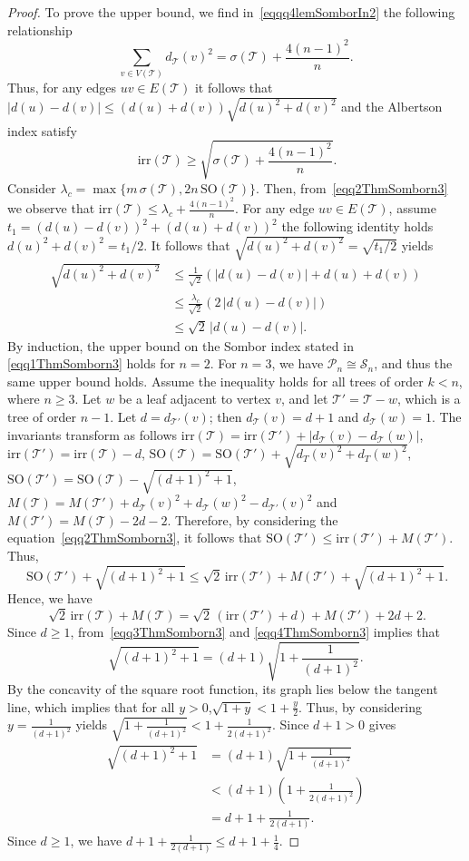 \documentclass[12pt, a4paper]{article}
\newcommand{\TT}{\mathcal{T}}
\newcommand{\irr}{\mathrm{irr}}
\newcommand{\SO}{\mathrm{SO}}
\begin{document}
\begin{proof}
To prove the upper bound, we find in~\eqref{eqqq4lemSomborIn2} the following relationship
\[
\sum_{v\in V(\TT)}d_\TT(v)^2=\sigma(\TT)+\frac{4(n-1)^2}{n}.
\]
Thus, for any edges $uv\in E(\TT)$ it follows that $|d(u)-d(v)|\leqslant (d(u)+d(v))\sqrt{d(u)^2+d(v)^2}$  and the Albertson index satisfy
\begin{equation}~\label{eqq2ThmSomborn3}
\irr(\TT)\geqslant \sqrt{\sigma(\TT)+\frac{4(n-1)^2}{n}}.
\end{equation}
 Consider $\lambda_c=\max\{m\,\sigma(\TT),2n\,\SO(\TT)\}$. Then, from~\eqref{eqq2ThmSomborn3} we observe that $\irr(\TT)\leqslant \lambda_c+\frac{4(n-1)^2}{n}$. For any edge $uv \in E(\TT)$, assume $t_1=(d(u)-d(v))^2+(d(u)+d(v))^2$ the following identity holds $d(u)^2+d(v)^2=t_1/2$. It follows that $\sqrt{d(u)^2+d(v)^2}=\sqrt{t_1/2}$  yields
 \begin{align*}
 \sqrt{d(u)^2+d(v)^2} &\leqslant \frac{1}{\sqrt{2}}(|d(u)-d(v)|+d(u)+d(v))\\
 &\leqslant \frac{\lambda_c}{\sqrt{2}}(2\,|d(u)-d(v)|)\\
 &\leqslant \sqrt{2}\,|d(u)-d(v)|.
 \end{align*}
By induction, the upper bound on the Sombor index stated in \eqref{eqq1ThmSomborn3} holds for $n=2$. For $n=3$, we have $\mathcal{P}_n \cong \mathcal{S}_n$, and thus the same upper bound holds. Assume the inequality holds for all trees of order $k<n$, where $n \geqslant 3$. Let $w$ be a leaf adjacent to vertex $v$, and let $\TT'=\TT-w$, which is a tree of order $n-1$. Let $d=d_{\TT'}(v)$; then $d_\TT(v)=d+1$ and $d_\TT(w)=1$. The invariants transform as follows $\irr(\TT)=\irr(\TT')+|d_\TT(v)-d_\TT(w)|$, $\irr(\TT')=\irr(\TT)-d$, $\SO(\TT)=\SO(\TT')+\sqrt{d_T(v)^2 + d_T(w)^2}$, $\SO(\TT')=\SO(\TT)-\sqrt{(d+1)^2+1}$, $M(\TT)=M(\TT')+d_\TT(v)^2+d_\TT(w)^2-d_{\TT'}(v)^2$ and $M(\TT')=M(\TT)-2d-2$. Therefore, by considering the equation~\eqref{eqq2ThmSomborn3}, it follows that $\SO(\TT')\leqslant \irr(\TT')+M(\TT')$. Thus,  
\begin{equation}~\label{eqq3ThmSomborn3}
\SO(\TT')+\sqrt{(d+1)^2+1}\leqslant \sqrt{2}\, \irr(\TT')+M(\TT')+ \sqrt{(d+1)^2+1}.
\end{equation}
Hence, we have 
\begin{equation}~\label{eqq4ThmSomborn3}
\sqrt{2}\,\irr(\TT)+M(\TT)=\sqrt{2}\,(\irr(\TT')+d)+M(\TT')+2d+2.
\end{equation}
Since $d \geqslant 1$, from~\eqref{eqq3ThmSomborn3} and \eqref{eqq4ThmSomborn3} implies that
\[
\sqrt{(d+1)^2+1}=(d+1)\sqrt{1+\frac{1}{(d+1)^2}}.
\]
By the concavity of the square root function, its graph lies below the tangent line, which implies that for all $y>0$,$\sqrt{1+y}<1+\frac{y}{2}$. Thus, by considering $y=\frac{1}{(d+1)^2}$ yields $\sqrt{1+\frac{1}{(d+1)^2}}<1+\frac{1}{2(d+1)^2}$. Since $d+1>0$ gives
\begin{align*}
\sqrt{(d+1)^2+1}&= (d+1)\sqrt{1+\frac{1}{(d+1)^2}}\\
&<(d+1) \left(1+\frac{1}{2(d+1)^2}\right)\\
&=d+1+\frac{1}{2(d+1)}.
\end{align*}
Since $d \geqslant 1$, we have $d+1+\frac{1}{2(d+1)}\leqslant d+1+\frac{1}{4}$. 


\end{proof}
\end{document}
